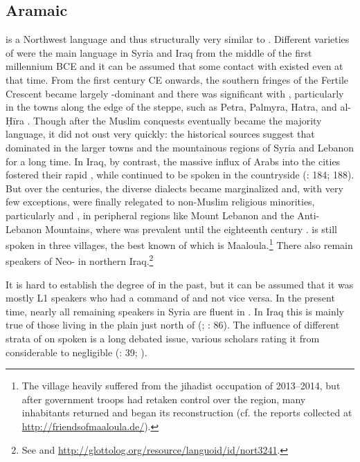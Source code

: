 \documentclass[output=paper]{langsci/langscibook}
\begin{document}
  \subsection{Aramaic} \label{aram}
 is a Northwest  language and thus structurally very similar to . Different varieties of  were the main language in Syria and Iraq from the middle of the first millennium BCE and it can be assumed that some contact with  existed even at that time. From the first century CE onwards, the southern fringes of the Fertile Crescent became largely -dominant and there was significant  with , particularly in the towns along the edge of the steppe, such as Petra, Palmyra, Hatra, and al-Ḥīra \citep[260--262]{Procházka2018Fertile}. Though after the Muslim conquests  eventually became the majority language, it did not oust  very quickly: the historical sources suggest that  dominated in the larger towns and the mountainous regions of Syria and Lebanon for a long time. In Iraq, by contrast, the massive influx of Arabs into the cities fostered their rapid , while  continued to be spoken in the countryside (\citealt{Magidow2013}: 184; 188). But over the centuries, the diverse  dialects became marginalized and, with very few exceptions, were finally relegated to non-Muslim religious minorities, particularly  and , in peripheral regions like Mount Lebanon and the Anti-Lebanon Mountains, where  was prevalent until the eighteenth century \citep{Retsö2011}.   is still spoken in three  villages, the best known of which is Maaloula.\footnote{The village heavily suffered from the jihadist occupation of 2013--2014, but after government troops had retaken control over the region, many inhabitants returned and began its reconstruction (cf. the reports collected at \url{http://friendsofmaaloula.de/}).} There also remain speakers of Neo- in northern Iraq.\footnote{See \citet{Coghill2012} and \url{http://glottolog.org/resource/languoid/id/nort3241}.} 

It is hard to establish the degree of  in the past, but it can be assumed that it was mostly  L1 speakers who had a command of  and not vice versa. In the present time, nearly all remaining  speakers in Syria are fluent in . In Iraq this is mainly true of those living in the plain just north of  (\citealt{ArnoldBehnstedt1993}; \citealt{Coghill2012}: 86). The influence of different strata of  on spoken  is a long debated issue, various scholars rating it from considerable to negligible (\citealt{Hopkins1995}: 39; \citealt{Lentin2018}).
\end{document}
